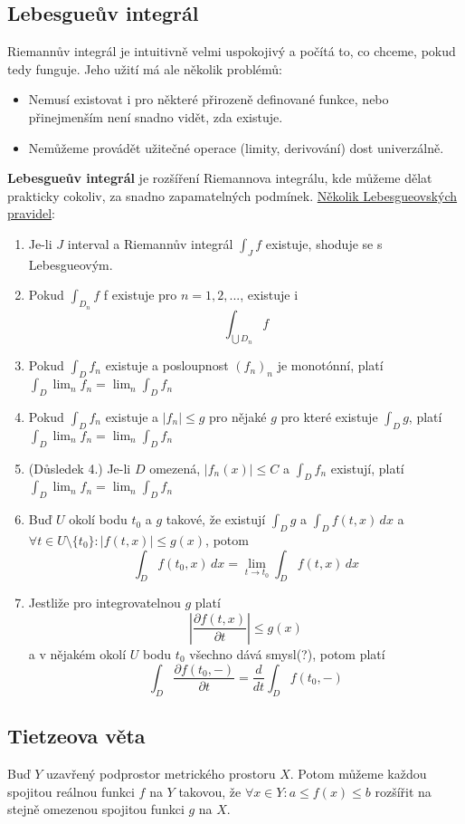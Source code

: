 \documentclass[../main.tex]{subfiles}
\begin{document}
\subsection{Lebesgueův integrál}
\hspace{1.2mm}
Riemannův integrál je intuitivně velmi uspokojivý a počítá to, co chceme, pokud tedy funguje.
Jeho užití má ale několik problémů:
\begin{itemize}
    \item Nemusí existovat i pro některé přirozeně definované funkce, nebo
    přinejmenším není snadno vidět, zda existuje.
    \item Nemůžeme provádět užitečné operace (limity, derivování) dost univerzálně.
\end{itemize}
\textbf{Lebesgueův integrál} je rozšíření Riemannova integrálu, kde můžeme dělat prakticky cokoliv,
za snadno zapamatelných podmínek.
\underline{Několik Lebesgueovských pravidel}:
\begin{enumerate}
    \item Je-li $J$ interval a Riemannův integrál $\int_{J} f$ existuje, shoduje se s Lebesgueovým.
    \item Pokud $ \int_{D_n} f $ f existuje pro $n = 1, 2, ...$, existuje i \[\int_{\bigcup D_n} f\]
    \item Pokud $ \int_{D} f_n $ existuje a posloupnost $(f_n)_n$ je monotónní, platí
    \( \int_D \lim_n f_n = \lim_n \int_D f_n \)
    \item Pokud $\int_D f_n$ existuje a $|f_n|\leq g$ pro nějaké $g$ pro které existuje
    $\int_D g$, platí
    \( \int_D \lim_n f_n = \lim_n \int_D f_n \)
    \item (Důsledek 4.) Je-li $D$ omezená, $|f_n(x)| \leq C$ a $\int_D f_n$ existují, platí
    \( \int_D \lim_n f_n = \lim_n \int_D f_n \)
    \item Buď $U$ okolí bodu $t_0$ a $g$ takové, že existují $\int_D g$ a $\int_D f(t,x)\,dx$ a
    $\forall t \in U\textrm{\textbackslash}\{t_0\}: |f(t,x)|\leq g(x)$, potom
    \[ \int_D f(t_0, x)\,dx = \lim_{t\to t_0} \int_D f(t,x)\,dx \]
    \item Jestliže pro integrovatelnou $g$ platí
    \[ \left| \frac{\partial f(t,x)}{\partial t} \right| \leq g(x) \]
    a v nějakém okolí $U$ bodu $t_0$ všechno dává smysl(?), potom platí
    \[ \int_D \frac{\partial f(t_0,-)}{\partial t} = \frac{d}{dt} \int_D f(t_0, -)\]
\end{enumerate}


\subsection{Tietzeova věta}
\hspace{1.2mm}
Buď $Y$ uzavřený podprostor metrického prostoru $X$. Potom můžeme každou spojitou reálnou
funkci $f$ na $Y$ takovou, že $\forall x \in Y: a \leq f(x) \leq b$ rozšířit na stejně omezenou
spojitou funkci $g$ na $X$.
\end{document}
